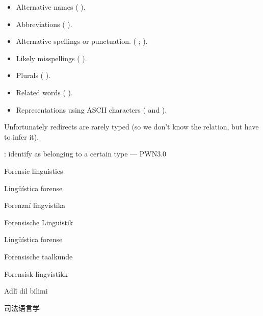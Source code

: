 \documentclass[a4paper,landscape,headrule,footrule,xetex]{foils}
\begin{document}

\begin{itemize}\addtolength{\itemsep}{-1ex}
\item  Alternative names ( \into {}).
\item Abbreviations ( \into {}).
\item Alternative spellings or punctuation. ( \into {};  \into {}).
\item Likely misspellings ( \into {}).
\item Plurals ( \into {}).
\item Related words ( \into {}).
\item Representations using ASCII characters ( and  \into  {}). 
 \end{itemize}

Unfortunately redirects are rarely typed (so we don't know the
relation, but have to infer it).

: identify as belonging to a certain type ---   PWN3.0

\MyLogo{}
\begin{description}\addtolength{\itemsep}{-1ex}
\item[en] Forensic linguistics
\item[ca] Lingüística forense
\item[cs] Forenzní lingvistika
\item[de] Forensische Linguistik
\item[es] Lingüística forense
\item[nl] Forensische taalkunde
\item[no] Forensisk lingvistikk
\item[tr] Adlî dil bilimi
\item[zh] 司法语言学
\end{description}
\end{document}

